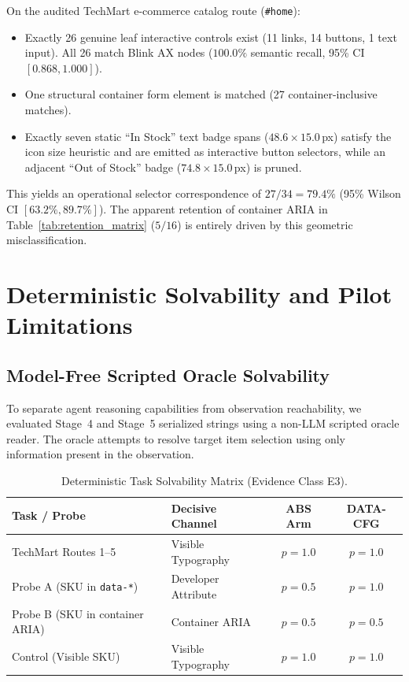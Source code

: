 \documentclass[conference]{IEEEtran}
\begin{document}
On the audited TechMart e-commerce catalog route (\texttt{\#home}):
\begin{itemize}
    \item Exactly 26 genuine leaf interactive controls exist (11 links, 14 buttons, 1 text input). All 26 match Blink AX nodes ($100.0\%$ semantic recall, 95\% CI $[0.868, 1.000]$).
    \item One structural container form element is matched (27 container-inclusive matches).
    \item Exactly seven static ``In Stock'' text badge spans ($48.6 \times 15.0$\,px) satisfy the icon size heuristic and are emitted as interactive button selectors, while an adjacent ``Out of Stock'' badge ($74.8 \times 15.0$\,px) is pruned.
\end{itemize}
This yields an operational selector correspondence of $27/34 = \mathbf{79.4\%}$ (95\% Wilson CI $[63.2\%, 89.7\%]$). The apparent retention of container ARIA in Table~\ref{tab:retention_matrix} ($5/16$) is entirely driven by this geometric misclassification.

\section{Deterministic Solvability and Pilot Limitations}
\label{sec:solvability}

\subsection{Model-Free Scripted Oracle Solvability}
To separate agent reasoning capabilities from observation reachability, we evaluated Stage~4 and Stage~5 serialized strings using a non-LLM scripted oracle reader. The oracle attempts to resolve target item selection using only information present in the observation.

\begin{table}[t]
\centering
\footnotesize
\caption{Deterministic Task Solvability Matrix (Evidence Class E3).}
\label{tab:solvability}
\begin{tabularx}{\columnwidth}{lXcc}
\toprule
\textbf{Task / Probe} & \textbf{Decisive Channel} & \textbf{ABS Arm} & \textbf{DATA-CFG} \\
\midrule
TechMart Routes 1--5 & Visible Typography & \textbf{$p=1.0$} & \textbf{$p=1.0$} \\
Probe A (SKU in \texttt{data-*}) & Developer Attribute & $p=0.5$ & \textbf{$p=1.0$} \\
Probe B (SKU in container ARIA) & Container ARIA & $p=0.5$ & $p=0.5$ \\
Control (Visible SKU) & Visible Typography & \textbf{$p=1.0$} & \textbf{$p=1.0$} \\
\bottomrule
\end{tabularx}
\end{table}
\end{document}

